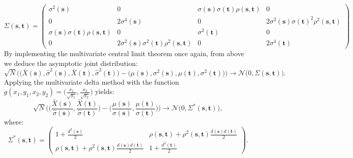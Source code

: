 \begin{equation}
\label{eq:17}
\Sigma(\bm{s},\bm{t}) = 
\begin{pmatrix}
	\sigma^{2}(\bm{s}) & 0 & \sigma(\bm{s})\sigma(\bm{t})\rho(\bm{s},\bm{t}) & 0  \\
    0 & 2\sigma^{4}(\bm{s}) & 0 & 2\sigma^{2}(\bm{s})\sigma(\bm{t})^{2}\rho^{2}(\bm{s},\bm{t}) \\
    \sigma(\bm{s})\sigma(\bm{t})\rho(\bm{s},\bm{t}) & 0 & \sigma^{2}(\bm{t}) & 0 \\
   0 & 2\sigma^{2}(\bm{s})\sigma^{2}(\bm{t})\rho^{2}(\bm{s},\bm{t}) & 0 & 2\sigma^{4}(\bm{t})
\end{pmatrix}
\end{equation}
By implementing the multivariate central limit theorem once again, from above we deduce the asymptotic joint distribution:
\begin{equation}
\label{eq:joint_limiting_distribution_again}
\sqrt{N}\Big(\Big(\bar{X}(\bm{s}), \hat{\sigma}^{2}(\bm{s}), \bar{X}(\bm{t}), \hat{\sigma}^{2}(\bm{t}) \Big) - \Big(\mu(\bm{s}),\sigma^{2}(\bm{s}),\mu(\bm{t}),\sigma^{2}(\bm{t})\Big)\Big) \rightarrow \mathcal{N}\Big(0, \Sigma(\bm{s},\bm{t}) \Big).
\end{equation}
Applying the multivariate delta method with the function $g(x_{1}, y_{1}, x_{2}, y_{2}) = \Big( \frac{x_{1}}{\sqrt{y_1}}, \frac{x_{2}}{\sqrt{y_{2}}} \Big)$ yields:
\begin{equation}
\label{eq:cohen_limiting_distribtuion_covariance}
\sqrt{N}\Bigg( \Bigg(\frac{\bar{X}(\bm{s})}{\hat{\sigma}(\bm{s})}, \frac{\bar{X}(\bm{t})}{\hat{\sigma}(\bm{t})} \Bigg) - \Bigg(\frac{\mu(\bm{s})}{\sigma(\bm{s})}, \frac{\mu(\bm{t})}{\sigma(\bm{t})} \Bigg) \Bigg) \rightarrow \mathcal{N}\Big(0, \Sigma^{*}(\bm{s},\bm{t}) \Big),
\end{equation}
where:
\begin{equation}
\label{eq:cohen_limiting_covariance_matrix}
 \Sigma^{*}(\bm{s},\bm{t}) = \begin{pmatrix}
	1 + \frac{d^{2}({\bm{s}})}{2} & \rho(\bm{s},\bm{t}) + \rho^{2}(\bm{s},\bm{t})\frac{d({\bm{s}})d({\bm{t}})}{2} \\
    \rho(\bm{s},\bm{t}) + \rho^{2}(\bm{s},\bm{t})\frac{d({\bm{s}})d({\bm{t}})}{2} & 1 + \frac{d^{2}({\bm{t}})}{2}
\end{pmatrix}.
\end{equation}

